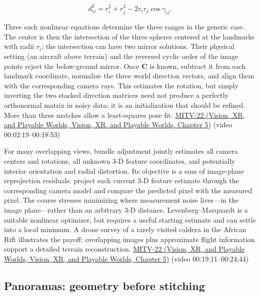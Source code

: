 \[
d_{ij}^2=r_i^2+r_j^2-2r_ir_j\cos\gamma_{ij}.
\]

Three such nonlinear equations determine the three ranges in the generic case. The center is then the intersection of the three spheres centered at the landmarks with radii \(r_i\); the intersection can have two mirror solutions. Their physical setting (an aircraft above terrain) and the reversed cyclic order of the image points reject the below-ground mirror. Once \(\mathbf C\) is known, subtract it from each landmark coordinate, normalize the three world direction vectors, and align them with the corresponding camera rays. This estimates the rotation, but simply inverting the two stacked direction matrices need not produce a perfectly orthonormal matrix in noisy data; it is an initialization that should be refined. More than three matches allow a least-squares pose fit. \href{../07-Vision-XR-and-Playable-Worlds/main.pdf\#nameddest=04-visual-computing-ii-ch036-mitv-22---exterior-orientation-recovering-position-orientation-bundle-adjustment-object-shape}{MITV-22 (Vision, XR, and Playable Worlds, Vision, XR, and Playable Worlds, Chapter 5)} (video 00:02:19--00:18:53)

For many overlapping views, bundle adjustment jointly estimates all camera centers and rotations, all unknown 3-D feature coordinates, and potentially interior orientation and radial distortion. Its objective is a sum of image-plane reprojection residuals: project each current 3-D feature estimate through the corresponding camera model and compare the predicted pixel with the measured pixel. The course stresses minimizing where measurement noise lives---in the image plane---rather than an arbitrary 3-D distance. Levenberg--Marquardt is a suitable nonlinear optimizer, but requires a useful starting estimate and can settle into a local minimum. A drone survey of a rarely visited caldera in the African Rift illustrates the payoff: overlapping images plus approximate flight information support a detailed terrain reconstruction. \href{../07-Vision-XR-and-Playable-Worlds/main.pdf\#nameddest=04-visual-computing-ii-ch036-mitv-22---exterior-orientation-recovering-position-orientation-bundle-adjustment-object-shape}{MITV-22 (Vision, XR, and Playable Worlds, Vision, XR, and Playable Worlds, Chapter 5)} (video 00:19:11--00:24:44)

\subsection{Panoramas: geometry before stitching}\label{03-visual-computing-i-ch003-panoramas-geometry-before-stitching}

